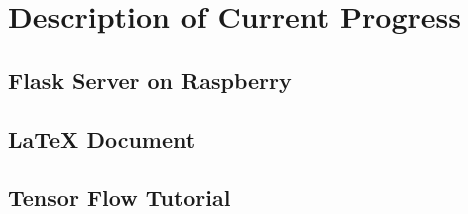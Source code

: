 \chapter{Description of Current Progress}
\label{current-progress}



\section{Flask Server on Raspberry}
\section{LaTeX Document}			%
\section{Tensor Flow Tutorial}

